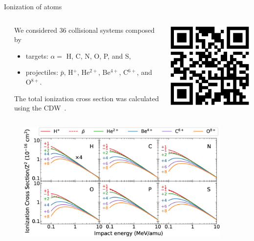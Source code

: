 \documentclass[final]{beamer}
\begin{document}
\begin{frame}[t]
\begin{columns}[t]
\begin{column}{.46\textwidth}
\begin{block}{Ionization of atoms}
\vspace{1.cm}
\begin{minipage}{\textwidth}
\begin{columns}[T]
\begin{column}{0.025\textwidth}
\end{column}
\begin{column}{0.8\textwidth}
We considered 36 collisional systems composed by 
\begin{itemize}
\item targets: $\alpha=$ \colorbox{tabutter}{H, C, N, O, P, and S,}
\item projectiles: \colorbox{tabutter}{$\bar{p}$, H$^{+}$, He$^{2+}$, Be$^{4+}$, C$^{6+}$, and O$^{8+}$.}
\end{itemize}
The total ionization cross section was calculated using the 
CDW~\cite{miraglia2019}.
\end{column}
\begin{column}{0.2\textwidth}
\includegraphics[width=6cm]{miraglia2019.eps}
\end{column}
\end{columns}
\end{minipage}

\vspace{0.1cm}
\begin{figure}
\centering
\includegraphics[width=0.95\textwidth]{figures/atomicscaling.eps}
\end{figure}


\end{block}
\end{column}
\end{columns}
\end{frame}
\end{document}
